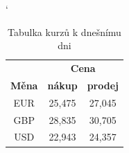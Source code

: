 \documentclass[a4paper, 11pt]{article}
\begin{document}
    \bigskip
    
    \begin{table}[h]
        \catcode`
        \centering
        \begin{tabular}{|c|c|c|}
            \hline
            & \multicolumn{2}{c|}{\textbf{Cena}} \\ \cline{2-3}
            \textbf{Měna} & \textbf{nákup} & \textbf{prodej} \\ \hline
            EUR & 25,475 & 27,045 \\
            GBP & 28,835 & 30,705 \\
            USD & 22,943 & 24,357 \\ \hline
        \end{tabular}
    \caption{Tabulka kurzů k dnešnímu dni}
    \label{table_1}
    \end{table}
    
    \bigskip
    
\end{document}
